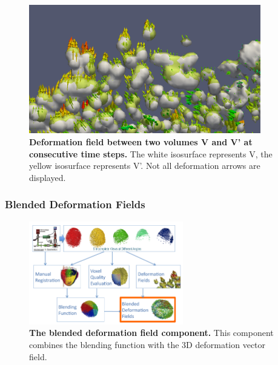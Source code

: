 \begin{figure}
\begin{center}
\includegraphics[width=0.9\textwidth]{../../images/Reconstruction/washington/deffield/vueDeffield2ts.png}
\end{center}
\caption{\textbf{Deformation field between two volumes V and V' at consecutive time steps.} The white isosurface represents V, the yellow isosurface represents V'. Not all deformation arrows are displayed.}
\label{washington_vueDeffield2ts}
\end{figure}

\subsubsection{Blended Deformation Fields  }
\begin{figure}
\begin{center}
\includegraphics[width=0.6\textwidth]{../../images/Reconstruction/washington/workflow_blend_deffield_corrected.png}
\end{center}
\caption{\textbf{The blended deformation field component.} This component combines the blending function with the 3D deformation vector field.}
\label{washington_workflow_blend_deffield}
\end{figure}

